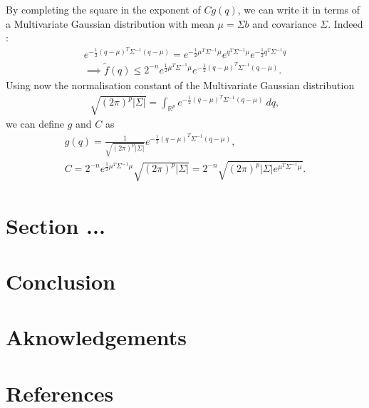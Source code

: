\documentclass[a4paper, 12pt,oneside]{article}
\begin{document}
	By completing the square in the exponent of $Cg(q)$, we can write it in terms of a Multivariate Gaussian distribution with mean $\mu=\Sigma b$ and covariance $\Sigma$. Indeed : 
	\begin{gather}
		e^{-\frac{1}{2}(q-\mu)^T\Sigma^{-1} (q-\mu)} =
		e^{-\frac{1}{2}\mu^T\Sigma^{-1}\mu}
		e^{q^T\Sigma^{-1}\mu}
		e^{-\frac{1}{2}q^T\Sigma^{-1} q} \\
		\implies \tilde{f}(q) \le 2^{-n}e^{\frac{1}{2}\mu^T\Sigma^{-1} \mu}e^{-\frac{1}{2}(q-\mu)^T\Sigma^{-1}(q-\mu)}.
	\end{gather}
	Using now the normalisation constant of the Multivariate Gaussian distribution 
	\begin{gather}
		\sqrt{(2\pi)^p|\Sigma|}=\int_{\mathbb{R}^p}e^{-\frac{1}{2}(q-\mu)^T\Sigma^{-1}(q-\mu)}\ dq,
	\end{gather} 
	we can define $g$ and $C$ as 
	\begin{gather}
		g(q)=\frac{1}{\sqrt{(2\pi)^p|\Sigma|}}e^{-\frac{1}{2}(q-\mu)^T\Sigma^{-1}(q-\mu)}, \\
		C = 2^{-n}e^{\frac{1}{2}\mu^T\Sigma^{-1} \mu}{\sqrt{(2\pi)^p|\Sigma|}} = 2^{-n}\sqrt{(2\pi)^p|\Sigma|e^{\mu^T\Sigma^{-1} \mu}}.
	\end{gather} 
	\section{Section ...}
	\section{Conclusion}
	\section*{Aknowledgements}
	\section*{References}
\end{document}
